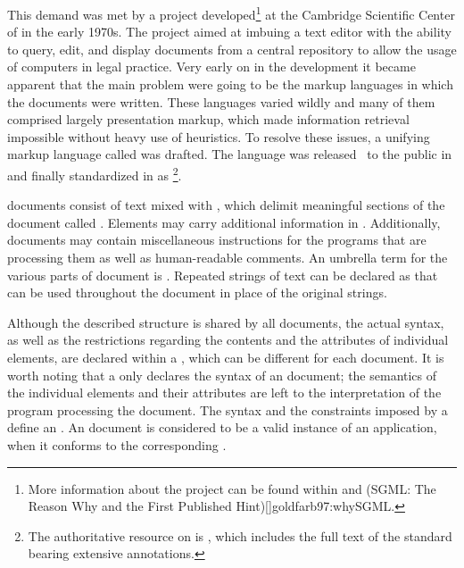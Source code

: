 This demand was met by a project developed\footnote{
  More information about the project can be found within
   and \citework*(SGML: The Reason Why and the First
  Published Hint)[]{goldfarb97:whySGML}.
} at the Cambridge Scientific Center of  in the early 1970s. The
project aimed at imbuing a text editor with the ability to query, edit, and
display documents from a central repository to allow the usage of computers in
legal practice. Very early on in the development it became apparent that the
main problem were going to be the markup languages in which the documents were
written. These languages varied wildly and many of them comprised largely
presentation markup, which made information retrieval impossible without heavy
use of heuristics. To resolve these issues, a unifying markup language called
 was drafted. The language was released~\cite{goldfarb81} to the
public in \citeyear{goldfarb81} and finally standardized in \citeyear{iso86} as
\footnote{
  The authoritative resource on  is , which
  includes the full text of the standard bearing extensive annotations.
}.~\cite{iso86}

 documents consist of text mixed with %
, which delimit meaningful sections of the document called
. Elements may carry additional
information in . Additionally,
 documents may contain miscellaneous instructions for the programs
that are processing them as well as human-readable comments. An umbrella term for
the various parts of  document is
. Repeated strings of text can be declared
as   that can be used
throughout the document in place of the original strings. 

Although the described structure is shared by all  documents, the
actual syntax, as well as the restrictions regarding the contents and the
attributes of individual elements, are declared within a , which
can be different for each document. It is worth noting that a  only
declares the syntax of an  document; the semantics of the
individual elements and their attributes are left to the interpretation of the
program processing the document. The syntax and the constraints imposed by a
 define an %
. An  document is considered to be a
valid instance of an  application, when it conforms to the
corresponding .

